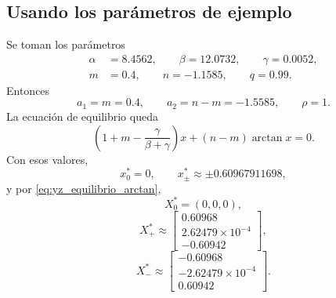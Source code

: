\documentclass[journal]{IEEEtran}
\begin{document}
\subsection{Usando los parámetros de ejemplo}

Se toman los parámetros
\begin{equation}
\label{eq:wu_params}
\begin{aligned}
\alpha&=8.4562,
\qquad \beta=12.0732,
\qquad \gamma=0.0052,\\
m&=0.4,
\qquad n=-1.1585,
\qquad q=0.99.
\end{aligned}
\end{equation}
Entonces
\begin{equation}
\label{eq:wu_a_params}
a_1=m=0.4,
\qquad
a_2=n-m=-1.5585,
\qquad
\rho=1.
\end{equation}
La ecuación de equilibrio queda
\begin{equation}
\label{eq:wu_equilibrium_scalar}
\left(1+m-\frac{\gamma}{\beta+\gamma}\right)x+(n-m)\arctan x=0.
\end{equation}
Con esos valores,
\begin{equation}
\label{eq:wu_equilibria_x}
x_0^*=0,
\qquad
x_\pm^*\approx\pm0.60967911698,
\end{equation}
y por \eqref{eq:yz_equilibrio_arctan},
\begin{equation}
\label{eq:wu_equilibrium_origin}
X_0^*=(0,0,0),
\end{equation}
\begin{equation}
\label{eq:wu_equilibrium_plus}
X_+^*\approx
\begin{bmatrix}
0.60968\\
2.62479\times10^{-4}\\
-0.60942
\end{bmatrix},
\end{equation}
\begin{equation}
\label{eq:wu_equilibrium_minus}
X_-^*\approx
\begin{bmatrix}
-0.60968\\
-2.62479\times10^{-4}\\
0.60942
\end{bmatrix}.
\end{equation}
\end{document}
